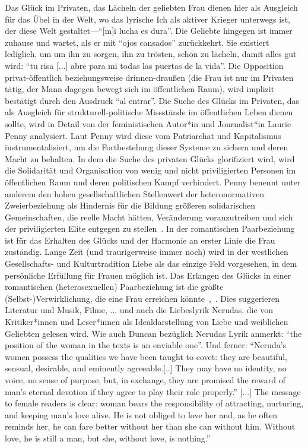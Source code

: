 Das Glück im Privaten, das Lächeln der geliebten Frau dienen hier als Ausgleich für das Übel in der Welt, wo das lyrische Ich als aktiver Krieger unterwegs ist, der diese Welt gestaltet—``[m]i lucha es dura''.
Die Geliebte hingegen ist immer zuhause und wartet, als er mit ``ojos cansados'' zurückkehrt.
Sie existiert lediglich, um um ihn zu sorgen, ihn zu trösten, schön zu lächeln, damit alles gut wird: ``tu risa [...] abre para mi todas las puertas de la vida''.
Die Opposition privat-öffentlich beziehungsweise drinnen-draußen (die Frau ist nur im Privaten tätig, der Mann dagegen bewegt sich im öffentlichen Raum), wird implizit bestätigt durch den Ausdruck ``al entrar''.
Die Suche des Glücks im Privaten, das als Ausgleich für strukturell-politische Missstände im öffentlichen Leben dienen sollte, wird in Detail von der feministischen Autor*in und Journalist*in Laurie Penny analysiert.
Laut Penny wird diese vom Patriarchat und Kapitalismus instrumentalisiert, um die Fortbestehung dieser Systeme zu sichern und deren Macht zu behalten.
In dem die Suche des privaten Glücks glorifiziert wird, wird die Solidarität und Organisation von wenig und nicht priviligierten Personen im öffentlichen Raum und deren politischen Kampf verhindert.
Penny benennt unter anderem den hohen gesellschaftlichen Stellenwert der heteronormativen Zweierbeziehung als Hindernis für die Bildung größeren solidarischen Gemeinschaften, die reelle Macht hätten, Veränderung voranzutreiben und sich der priviligierten Elite entgegen zu stellen~\cite{Penny2014}.
In der romantischen Paarbeziehung ist für das Erhalten des Glücks und der Harmonie an erster Linie die Frau zuständig.
Lange Zeit (und traurigerweise immer noch) wird in der westlichen Gesellschafts- und Kulturtradition Liebe als das einzige Feld vorgesehen, in dem persönliche Erfüllung für Frauen möglich ist. %
Das Erlangen des Glücks in einer romantischen (heterosexuellen) Paarbeziehung ist die größte (Selbst-)Verwirklichung, die eine Frau erreichen könnte~\cite{Duncan1992},~\cite{Penny2014}.
Dies suggerieren Literatur und Musik, Filme, ... und auch die Liebeslyrik Nerudas, die von Kritiker*innen und Leser*innen als Idealdarstellung von Liebe und weiblichen Geliebten gelesen wird.
Wie auch Duncan bezüglich Nerudas Lyrik anmerkt: ``the position of the woman in the texts is an enviable one''.
Und ferner: ``Neruda's women  possess the qualities we have been taught to covet: they are beautiful,  sensual, desirable, and eminently agreeable.[..] They may have no identity, no voice, no sense of purpose,  but, in exchange, they are promised the reward of man's eternal devotion if they agree to play their role properly.''
[...] The message to  female readers is clear: woman bears the responsibility of attracting, nurturing, and keeping man's love alive. He is not obliged to love her and, as he often reminds her, he can fare better without her than she  can without him. Without love, he is still a man, but she, without love, is nothing.''%

